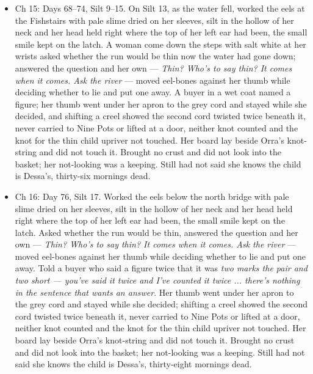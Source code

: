 \documentclass{design/chronicle}
\begin{document}
{\begin{itemize}[leftmargin=1.4em,itemsep=1pt,topsep=3pt,parsep=0pt]
\item Ch 15: Days 68–74, Silt 9–15. On Silt 13, as the water fell, worked the eels at the Fishstairs with pale slime dried on her sleeves, silt in the hollow of her neck and her head held right where the top of her left ear had been, the small smile kept on the latch. A woman come down the steps with salt white at her wrists asked whether the run would be thin now the water had gone down; answered the question and her own --- \emph{Thin? Who’s to say thin? It comes when it comes. Ask the river} --- moved eel-bones against her thumb while deciding whether to lie and put one away. A buyer in a wet coat named a figure; her thumb went under her apron to the grey cord and stayed while she decided, and shifting a creel showed the second cord twisted twice beneath it, never carried to Nine Pots or lifted at a door, neither knot counted and the knot for the thin child upriver not touched. Her board lay beside Orra’s knot-string and did not touch it. Brought no crust and did not look into the basket; her not-looking was a keeping. Still had not said she knows the child is Dessa’s, thirty-six mornings dead.

\end{itemize}

\begin{itemize}[leftmargin=1.4em,itemsep=1pt,topsep=3pt,parsep=0pt]

\item Ch 16: Day 76, Silt 17. Worked the eels below the north bridge with pale slime dried on her sleeves, silt in the hollow of her neck and her head held right where the top of her left ear had been, the small smile kept on the latch. Asked whether the run would be thin, answered the question and her own --- \emph{Thin? Who’s to say thin? It comes when it comes. Ask the river} --- moved eel-bones against her thumb while deciding whether to lie and put one away. Told a buyer who said a figure twice that it was \emph{two marks the pair and two short --- you’ve said it twice and I’ve counted it twice ... there’s nothing in the sentence that wants an answer}. Her thumb went under her apron to the grey cord and stayed while she decided; shifting a creel showed the second cord twisted twice beneath it, never carried to Nine Pots or lifted at a door, neither knot counted and the knot for the thin child upriver not touched. Her board lay beside Orra’s knot-string and did not touch it. Brought no crust and did not look into the basket; her not-looking was a keeping. Still had not said she knows the child is Dessa’s, thirty-eight mornings dead.


\end{itemize}}
\end{document}
